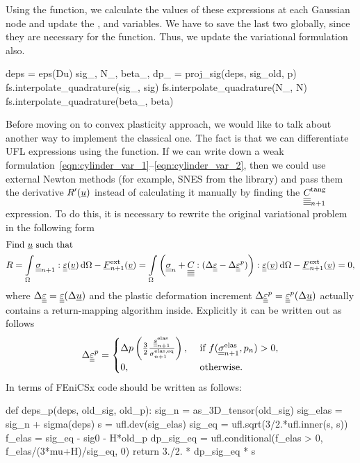 \documentclass[12pt]{article}
\begin{document}
Using the  function, we calculate the values of these expressions at each Gaussian node and update the ,  and  variables. We have to save the last two globally, since they are necessary for the  function. Thus, we update the variational formulation also.
\begin{pythoncode}
    deps = eps(Du)
    sig_, N_, beta_, dp_ = proj_sig(deps, sig_old, p)
    fs.interpolate_quadrature(sig_, sig)
    fs.interpolate_quadrature(N_, N)
    fs.interpolate_quadrature(beta_, beta)
\end{pythoncode}

Before moving on to convex plasticity approach, we would like to talk about another way to implement the classical one. The fact is that we can differentiate UFL expressions using the  function. If we can write down a weak formulation~\eqref{eqn:cylinder_var_1}--\eqref{eqn:cylinder_var_2}, then we could use external Newton methods (for example, SNES from the  library) and pass them the derivative $R^\prime(\underline{u})$ instead of calculating it manually by finding the $\underline{\underline{\underline{\underline{C_{}}}}}_{n+1}^\text{tang}$ expression. To do this, it is necessary to rewrite the original variational problem in the following form
\begin{align}
    & \text{Find } \underline{u} \text{ such that} \label{eqn:cylinder_SNES_var_1} \\
    & R = \int\limits_\Omega \underline{\underline{\sigma}}_{n+1} : \underline{\underline{\varepsilon}}(\underline{v}) \, \mathrm{d}\Omega - \underline{F}_{n+1}^\text{ext}(\underline{v}) = \int\limits_\Omega \left( \underline{\underline{\sigma}}_n + \underline{\underline{\underline{\underline{C_{}}}}} : (\Delta\underline{\underline{\varepsilon}} - \Delta\underline{\underline{\varepsilon}}^p) \right) : \underline{\underline{\varepsilon}}(\underline{v}) \, \mathrm{d}\Omega - \underline{F}_{n+1}^\text{ext}(\underline{v}) = 0, \label{eqn:cylinder_SNES_var_2}
\end{align}
where $\Delta\underline{\underline{\varepsilon}} = \underline{\underline{\varepsilon}}(\Delta\underline{u})$ and the plastic deformation increment $\Delta\underline{\underline{\varepsilon}}^p = \underline{\underline{\varepsilon}}^p(\Delta\underline{u})$ actually contains a return-mapping algorithm inside. Explicitly it can be written out as follows
\begin{equation}
    \Delta\underline{\underline{\varepsilon}}^p = 
        \begin{cases}
            \Delta p \left( \frac{3}{2}\frac{\underline{\underline{s}}_{n+1}^\text{elas}} {\sigma_{n+1}^\text{elas,eq}} \right), & \text{ if } f(\underline{\underline{\sigma}}_{n+1}^{\text{elas}}, p_n) > 0,  \\
            0, & \text{ otherwise}.
        \end{cases}
\end{equation}
In terms of FEniCSx code should be written as follows:
\begin{pythoncode}
    def deps_p(deps, old_sig, old_p):
        sig_n = as_3D_tensor(old_sig)
        sig_elas = sig_n + sigma(deps)
        s = ufl.dev(sig_elas)
        sig_eq = ufl.sqrt(3/2.*ufl.inner(s, s))
        f_elas = sig_eq - sig0 - H*old_p
        dp_sig_eq = ufl.conditional(f_elas > 0, f_elas/(3*mu+H)/sig_eq, 0) 
        return 3./2. * dp_sig_eq * s 
\end{pythoncode}
\end{document}
